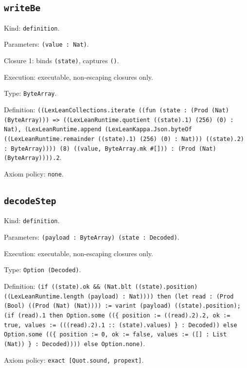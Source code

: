 \documentclass[11pt]{article}
\begin{document}
\subsection*{\texttt{writeBe}}
\noindent Kind: \texttt{definition}.\par
\noindent Parameters: \texttt{(value : Nat)}.\par
\noindent Closure 1: binds \texttt{(state)}, captures \texttt{()}.\par
\noindent Execution: executable, non-escaping closures only.\par
\noindent Type: \texttt{ByteArray}.\par
\noindent Definition: \texttt{((LexLeanCollections.iterate ((fun (state : (Prod (Nat) (ByteArray))) => ((LexLeanRuntime.quotient ((state).1) (256) (0) : Nat), (LexLeanRuntime.append (LexLeanKappa.Json.byteOf ((LexLeanRuntime.remainder ((state).1) (256) (0) : Nat))) ((state).2) : ByteArray)))) (8) ((value, ByteArray.mk \#[])) : (Prod (Nat) (ByteArray)))).2}.\par
\noindent Axiom policy: \texttt{none}.\par
\subsection*{\texttt{decodeStep}}
\noindent Kind: \texttt{definition}.\par
\noindent Parameters: \texttt{(payload : ByteArray) (state : Decoded)}.\par
\noindent Execution: executable, non-escaping closures only.\par
\noindent Type: \texttt{Option (Decoded)}.\par
\noindent Definition: \texttt{(if ((state).ok \&\& (Nat.blt ((state).position) ((LexLeanRuntime.length (payload) : Nat)))) then (let read : (Prod (Bool) ((Prod (Nat) (Nat)))) := varint (payload) ((state).position); (if (read).1 then Option.some ((\{ position := ((read).2).2, ok := true, values := (((read).2).1 :: (state).values) \} : Decoded)) else Option.some ((\{ position := 0, ok := false, values := ([] : List (Nat)) \} : Decoded)))) else Option.none)}.\par
\noindent Axiom policy: \texttt{exact [Quot.sound, propext]}.\par
\end{document}
